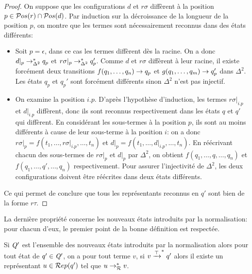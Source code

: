 \begin{proof}
  On suppose que les configurations $d$ et $r\sigma$ diffèrent à la position $p \in \mathcal{ P}os(r) \cap \mathcal{ P}os(d)$.
  Par induction sur la décroissance de la longueur de la position $p$, 
  on montre que les termes sont nécessairement reconnus dans des états différents:

  \begin{itemize}
  \item Soit $p = \epsilon$, dans ce cas les termes diffèrent dès la racine.
    On a donc $d|_p \rightarrow^*_{\Delta^2} q_p$ et $r\sigma|_p \rightarrow^*_{\Delta^2} q'_p$. Comme $d$ et $r\sigma$ diffèrent à leur racine,
    il existe forcément deux transitions $f(q_1, \dots,q_n) \rightarrow q_p$ et $g(q_1, \dots,q_m) \rightarrow q_p'$ dans $\Delta^2$. %
    Les états $q_p$ et $q_p'$ sont forcément différents sinon $\Delta^2$ n'est pas injectif. 
  \item On examine la position $i.p$. D'après l'hypothèse d'induction, les termes $r\sigma|_{i.p}$ et $d|_{i.p}$ diffèrent, donc ils 
    sont reconnus respectivement dans les états $q$ et $q'$ qui diffèrent. En considérant les sous-termes à la position $p$,
    ils sont au moins différents à cause de leur sous-terme à la position $i$: on a donc $r\sigma|_p = f(t_1, \dots, r\sigma|_{i.p},\dots,t_n)$ et $d|_p = f(t_1, \dots, d|_{i.p},\dots,t_n)$.
    En réécrivant chacun des sous-termes de $r\sigma|_p$ et $d|_p$ par $\Delta^2$, on obtient $f(q_1, \dots, q, \dots, q_n)$ et $f(q_1, \dots, q', \dots, q_n)$ respectivement.
    Pour assurer l'injectivité de $\Delta^2$, les deux configurations doivent être réécrites dans deux états différents.
  \end{itemize}
  Ce qui permet de conclure que tous les représentants reconnus en $q'$ sont bien de la forme $r\tau$.
\end{proof}


La dernière propriété concerne les nouveaux états introduits par la normalisation: pour chacun d'eux,
le premier point de la bonne définition est respectée.
\begin{property}
  \label{prop:norm_well_def}
  Si $\mathit Q'$ est l'ensemble des nouveaux états introduits par la normalisation alors pour tout état de $q'\in \mathit Q'$,
  on a pour tout terme $v$, si $v \xrightarrow{\top}^* q'$ alors il existe un représentant $u \in \mathcal R ep(q')$ tel que 
  $u \rightarrow^*_\mathcal R v$.
\end{property}

